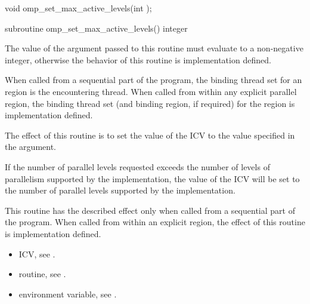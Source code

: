 \newpage %
\format
\begin{ccppspecific}
\begin{ompcFunction}
void omp_set_max_active_levels(int );
\end{ompcFunction}
\end{ccppspecific}

\begin{fortranspecific}
\begin{ompfSubroutine}
subroutine omp_set_max_active_levels()
integer 
\end{ompfSubroutine}
\end{fortranspecific}

\constraints
The value of the argument passed to this routine must evaluate to a non-negative integer, 
otherwise the behavior of this routine is implementation defined.

\binding
When called from a sequential part of the program, the binding thread set for an 
 region is the encountering thread. When called 
from within any explicit parallel region, the binding thread set (and binding region, if 
required) for the  region is implementation defined. 

\effect
The effect of this routine is to set the value of the  ICV to the value 
specified in the argument. 

If the number of parallel levels requested exceeds the number of levels of parallelism 
supported by the implementation, the value of the  ICV will be set 
to the number of parallel levels supported by the implementation.

This routine has the described effect only when called from a sequential part of the 
program. When called from within an explicit  region, the effect of this 
routine is implementation defined.

\crossreferences
\begin{itemize}
\item {} ICV, see 
.

\item {} routine, see 
.

\item {} environment variable, see 
.
\end{itemize}










